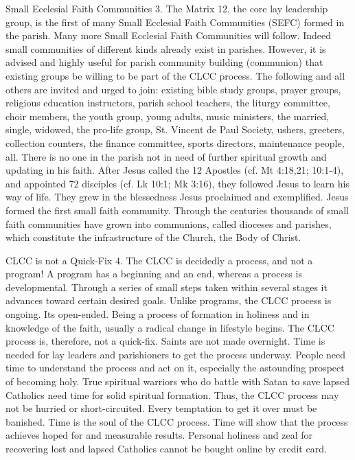 \documentclass[oneside]{book}
\begin{document}
Small Ecclesial Faith Communities 3. The Matrix 12, the core lay leadership
group, is the first of many Small Ecclesial Faith Communities (SEFC) formed in
the parish. Many more Small Ecclesial Faith Communities will follow. Indeed
small communities of different kinds already exist in parishes. However, it is
advised and highly useful for parish community building (communion) that
existing groups be willing to be part of the CLCC process. The following and all
others are invited and urged to join: existing bible study groups, prayer
groups, religious education instructors, parish school teachers, the liturgy
committee, choir members, the youth group, young adults, music ministers, the
married, single, widowed, the pro-life group, St. Vincent de Paul Society,
ushers, greeters, collection counters, the finance committee, sports directors,
maintenance people, all. There is no one in the parish not in need of further
spiritual growth and updating in his faith. After Jesus called the 12 Apostles
(cf. Mt 4:18,21; 10:1-4), and appointed 72 disciples (cf. Lk 10:1; Mk 3:16),
they followed Jesus to learn his way of life. They grew in the blessedness Jesus
proclaimed and exemplified. Jesus formed the first small faith
community. Through the centuries thousands of small faith communities have grown
into communions, called dioceses and parishes, which constitute the
infrastructure of the Church, the Body of Christ.

CLCC is not a Quick-Fix 4. The CLCC is decidedly a process, and not a program! A
program has a beginning and an end, whereas a process is developmental. Through
a series of small steps taken within several stages it advances toward certain
desired goals. Unlike programs, the CLCC process is ongoing. Its
open-ended. Being a process of formation in holiness and in knowledge of the
faith, usually a radical change in lifestyle begins. The CLCC process is,
therefore, not a quick-fix. Saints are not made overnight. Time is needed for
lay leaders and parishioners to get the process underway. People need time to
understand the process and act on it, especially the astounding prospect of
becoming holy. True spiritual warriors who do battle with Satan to save lapsed
Catholics need time for solid spiritual formation. Thus, the CLCC process may
not be hurried or short-circuited. Every temptation to get it over must be
banished. Time is the soul of the CLCC process. Time will show that the process
achieves hoped for and measurable results. Personal holiness and zeal for
recovering lost and lapsed Catholics cannot be bought online by credit card.
\end{document}
